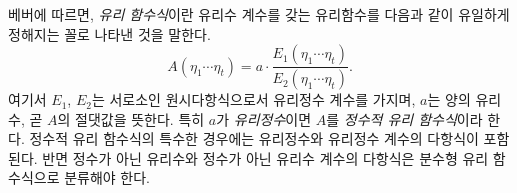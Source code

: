 
베버에 따르면, \emph{유리 함수식}이란 유리수 계수를 갖는 유리함수를 다음과 같이 유일하게 정해지는 꼴로 나타낸 것을 말한다.
\[
 A(\eta_1\cdots \eta_t)
   = a\cdot\frac{E_1(\eta_1\cdots \eta_t)}{E_2(\eta_1\cdots \eta_t)}.
\]
여기서 $E_1$, $E_2$는 서로소인 원시다항식으로서 유리정수 계수를 가지며, $a$는 양의 유리수, 곧 $A$의 절댓값을 뜻한다. 특히 $a$가 \emph{유리정수}이면 $A$를 \emph{정수적 유리 함수식}이라 한다. 정수적 유리 함수식의 특수한 경우에는 유리정수와 유리정수 계수의 다항식이 포함된다. 반면 정수가 아닌 유리수와 정수가 아닌 유리수 계수의 다항식은 분수형 유리 함수식으로 분류해야 한다.
